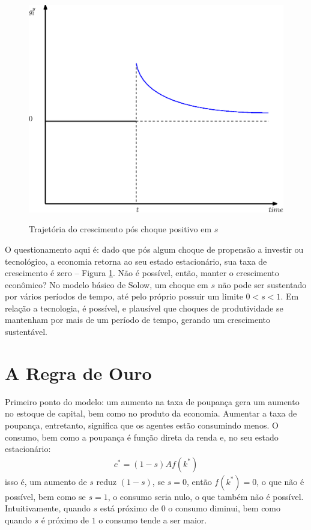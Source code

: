 \documentclass[11pt,a4paper]{article}
\begin{document}
\begin{figure}[!h]
\centering
\caption{Trajetória do crescimento pós choque positivo em $s$} \vspace{2ex}
\includegraphics[scale=.5]{solow08.eps}
\label{fig:convergencia5}
\end{figure} 

O questionamento aqui é: dado que pós algum choque de propensão a investir ou tecnológico, a economia retorna ao seu estado estacionário, sua taxa de crescimento é zero -- Figura \ref{fig:convergencia5}. Não é possível, então, manter o crescimento econômico? No modelo básico de Solow, um choque em $s$ não pode ser sustentado por vários períodos de tempo, até pelo próprio possuir um limite $0 < s < 1$. Em relação a tecnologia, é possível, e plausível que choques de produtividade se mantenham por mais de um período de tempo, gerando um crescimento sustentável.

\section{A Regra de Ouro}

Primeiro ponto do modelo: um aumento na taxa de poupança gera um aumento no estoque de capital, bem como no produto da economia. Aumentar a taxa de poupança, entretanto, significa que os agentes estão consumindo menos. O consumo, bem como a poupança é função direta da renda e, no seu estado estacionário:
\begin{align}
c^{\ast} = (1 - s)Af(k^{\ast})
\end{align} 
\noindent
isso é, um aumento de $s$ reduz $(1 - s)$, se $s = 0$, então $f(k^{\ast})=0$, o que não é possível, bem como se $s=1$, o consumo seria nulo, o que também não é possível. Intuitivamente, quando $s$ está próximo de $0$ o consumo diminui, bem como quando $s$ é próximo de $1$ o consumo tende a ser maior. 
\end{document}
